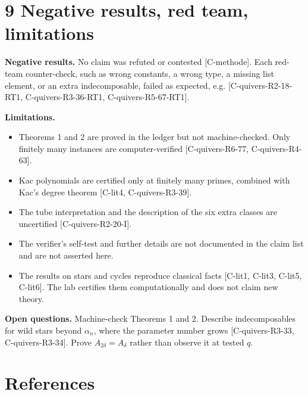 \documentclass[10pt,twocolumn]{article}
\begin{document}
\section*{9 Negative results, red team, limitations}

\textbf{Negative results.} No claim was refuted or contested {\scriptsize[C-methode]}. Each red-team counter-check, such as wrong constants, a wrong type, a missing list element, or an extra indecomposable, failed as expected, e.g. {\scriptsize[C-quivers-R2-18-RT1, C-quivers-R3-36-RT1, C-quivers-R5-67-RT1]}.

\textbf{Limitations.}
\begin{itemize}
\item Theorems 1 and 2 are proved in the ledger but not machine-checked. Only finitely many instances are computer-verified {\scriptsize[C-quivers-R6-77, C-quivers-R4-63]}.
\item Kac polynomials are certified only at finitely many primes, combined with Kac's degree theorem {\scriptsize[C-lit4, C-quivers-R3-39]}.
\item The tube interpretation and the description of the six extra classes are uncertified {\scriptsize[C-quivers-R2-20-I]}.
\item The verifier's self-test and further details are not documented in the claim list and are not asserted here.
\item The results on stars and cycles reproduce classical facts {\scriptsize[C-lit1, C-lit3, C-lit5, C-lit6]}. The lab certifies them computationally and does not claim new theory.
\end{itemize}

\textbf{Open questions.} Machine-check Theorems 1 and 2. Describe indecomposables for wild stars beyond $\alpha_n$, where the parameter number grows {\scriptsize[C-quivers-R3-33, C-quivers-R3-34]}. Prove $A_{2\delta}=A_\delta$ rather than observe it at tested $q$.

\section*{References}
\end{document}
